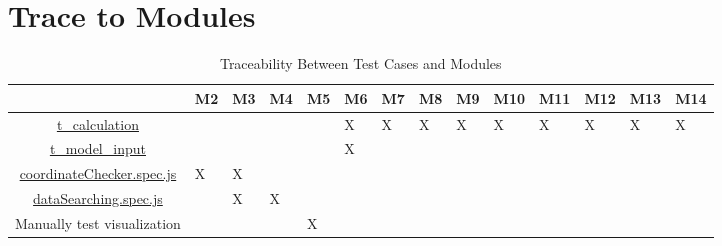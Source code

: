 \documentclass[12pt, titlepage]{article}
\begin{document}
\section{Trace to Modules}		
\begin{table}[h]
\centering

\begin{tabular}{|c|p{4mm}|p{4mm}|p{4mm}|p{4mm}|p{4mm}|p{4mm}|p{4mm}|p{4mm}|p{6mm}|p{6mm}|p{6mm}|p{6mm}|p{6mm}|}
\hline
	& M2 & M3 & M4  & M5 & M6 & M7 & M8 & M9 & M10 & M11 & M12 & M13 & M14 \\
\hline

\href{https://github.com/smiths/BridgeChlorideExposurePredictor/blob/main/src/database/test_calculation.py}{t\_calculation}    & &  &  &  & X & X & X & X & X & X & X & X & X \\ \hline
\href{https://github.com/smiths/BridgeChlorideExposurePredictor/blob/main/src/database/test_model_input.py}{t\_model\_input} & &  &  &  & X &  & &  &  &  &  &  & \\ \hline
\href{https://github.com/smiths/BridgeChlorideExposurePredictor/blob/main/src/web/tests/unit/coordinateChecker.spec.js}{coordinateChecker.spec.js} & X & X &  &  &  &  & &  &  &  &  &  & \\ \hline
\href{https://github.com/smiths/BridgeChlorideExposurePredictor/blob/main/src/web/tests/unit/dataSearching.spec.js}{dataSearching.spec.js} & & X & X &  &  &  & &  &  &  &  &  & \\ \hline
Manually test visualization & &  &  & X & &  &  & & & & &  & \\ \hline

\end{tabular}
\caption{Traceability Between Test Cases and Modules}
\label{Table:test_modules}
\end{table}




\newpage{}
\end{document}
